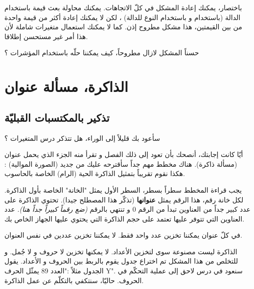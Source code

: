 باختصار، يمكنك إعادة المشكل في كلّ الاتجاهات. يمكنك محاولة بعث قيمة باستخدام الدالة (باستخدام
و باستخدام النوع
للدالة) ، لكن لا يمكنك إعادة أكثر من قيمة واحدة من بين القيمتين، هذا مشكل مطروح إذن. كما لا يمكنك استعمال متغيرات شاملة لأن هذا أمر غير مستحسن إطلاقا.

حسناً المشكل لازال مطروحاً، كيف يمكننا حلّه باستخدام المؤشرات ؟

\section{الذاكرة، مسألة عنوان}
\subsection{تذكير بالمكتسبات القبليّة}
سأعود بك قليلاً إلى الوراء، هل تتذكر درس المتغيرات ؟

أيّا كانت إجابتك، أنصحك بأن تعود إلى ذلك الفصل و تقرأ منه الجزء الذي يحمل عنوان (مسألة ذاكرة). هناك مخطط مهم جداً سأقترحه عليك من جديد (الصورة الموالية) :
هكذا نقوم تقريباً بتمثيل الذاكرة الحية (الرام) الخاصة بالحاسوب.

يجب قراءة المخطط سطراً بسطر، السطر الأول يمثل "الخانة" الخاصة بأول الذاكرة. لكل خانة رقم، هذا الرقم يمثل
\textbf{عنوانها}
(تذكّر هذا المصطلح جيدا). تحتوي الذاكرة على عدد كبير جداً من العناوين تبدأ من الرقم 0 و تنتهي بالرقم
\textit{(ضع رقماً كبيراً جداً هنا)}.
عدد العناوين التي تتوفر عليها تعتمد على حجم الذاكرة التي يحتوي عليها الجهاز الخاص بك.

في كلّ عنوان يمكننا تخزين عدد واحد فقط. لا يمكننا تخزين عددين في نفس العنوان.

الذاكرة ليست مصنوعة سوى لتخزين الأعداد. لا يمكنها تخزين لا حروف و لا جُمل. و للتخلص من هذا المشكل تم اختراع جدول يقوم بالربط بين الحروف و الأعداد. يقول الجدول مثلاً :"العدد 89 يمثّل الحرف
\textenglish{Y}".
سنعود في درس لاحق إلى عملية التحكّم في الحروف. حاليّا، سنتكفي بالتكلّم عن عمل الذاكرة.
